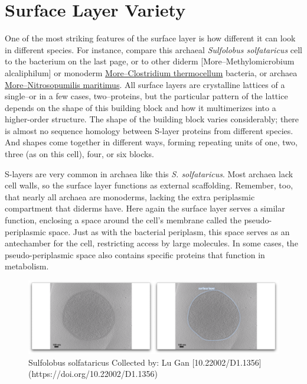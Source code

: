 \documentclass[]{tufte-book}
\begin{document}
\section{Surface Layer Variety}\label{surface-layer-variety}

One of the most striking features of the surface layer is how different
it can look in different species. For instance, compare this archaeal
\emph{Sulfolobus solfataricus} cell to the bacterium on the last page,
or to other diderm {[}More--Methylomicrobium alcaliphilum{]} or monoderm
\protect\hyperlink{moreclostridium-thermocellum}{More--Clostridium
thermocellum} bacteria, or archaea
\protect\hyperlink{moremethanoregula-formicica}{More--Nitrosopumilis
maritimus}. All surface layers are crystalline lattices of a single--or
in a few cases, two--proteins, but the particular pattern of the lattice
depends on the shape of this building block and how it multimerizes into
a higher-order structure. The shape of the building block varies
considerably; there is almost no sequence homology between S-layer
proteins from different species. And shapes come together in different
ways, forming repeating units of one, two, three (as on this cell),
four, or six blocks.

S-layers are very common in archaea like this \emph{S. solfataricus}.
Most archaea lack cell walls, so the surface layer functions as external
scaffolding. Remember, too, that nearly all archaea are monoderms,
lacking the extra periplasmic compartment that diderms have. Here again
the surface layer serves a similar function, enclosing a space around
the cell's membrane called the pseudo-periplasmic space. Just as with
the bacterial periplasm, this space serves as an antechamber for the
cell, restricting access by large molecules. In some cases, the
pseudo-periplasmic space also contains specific proteins that function
in metabolism.

\begin{figure}
\includegraphics{movie_stills/2_7} \caption[Sulfolobus solfataricus Collected by]{Sulfolobus solfataricus Collected by: Lu Gan [10.22002/D1.1356](https://doi.org/10.22002/D1.1356)}\label{fig:unnamed-chunk-37}
\end{figure}
\end{document}
